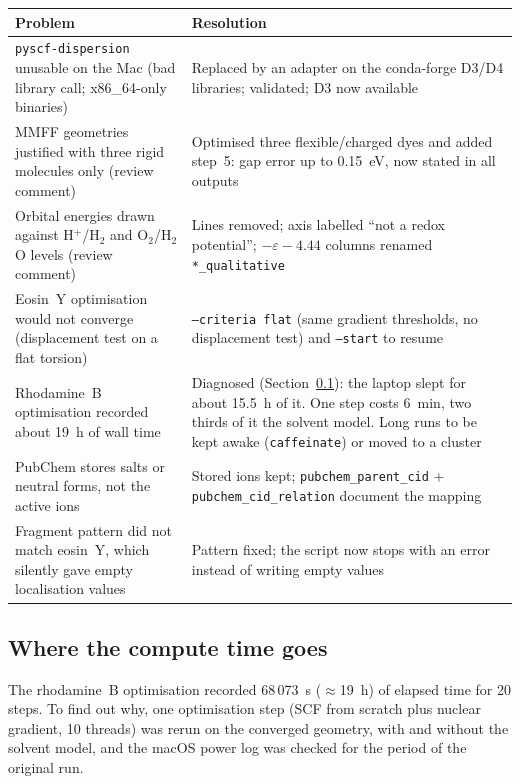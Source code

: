 \documentclass[11pt,a4paper]{article}
\begin{document}
\begin{center}\small
\begin{tabularx}{\linewidth}{@{}>{\raggedright\arraybackslash}p{4.1cm}>{\raggedright\arraybackslash}X@{}}
\toprule
Problem & Resolution \\
\midrule
\texttt{pyscf-dispersion} unusable on the Mac (bad library call; x86\_64-only binaries) &
  Replaced by an adapter on the conda-forge D3/D4 libraries; validated; D3 now available \\
MMFF geometries justified with three rigid molecules only (review comment) &
  Optimised three flexible/charged dyes and added step~5: gap error up to 0.15~eV, now stated in all outputs \\
Orbital energies drawn against H$^+$/H$_2$ and O$_2$/H$_2$O levels (review comment) &
  Lines removed; axis labelled ``not a redox potential''; $-\varepsilon-4.44$ columns renamed \texttt{*\_qualitative} \\
Eosin~Y optimisation would not converge (displacement test on a flat torsion) &
  \texttt{--criteria flat} (same gradient thresholds, no displacement test) and \texttt{--start} to resume \\
Rhodamine~B optimisation recorded about 19~h of wall time &
  Diagnosed (Section~\ref{sec:timing}): the laptop slept for about 15.5~h of it. One step costs 6~min, two thirds of it the solvent model. Long runs to be kept awake (\texttt{caffeinate}) or moved to a cluster \\
PubChem stores salts or neutral forms, not the active ions &
  Stored ions kept; \texttt{pubchem\_parent\_cid} + \texttt{pubchem\_cid\_relation} document the mapping \\
Fragment pattern did not match eosin~Y, which silently gave empty localisation values &
  Pattern fixed; the script now stops with an error instead of writing empty values \\
\bottomrule
\end{tabularx}
\end{center}

\subsection{Where the compute time goes}\label{sec:timing}
The rhodamine~B optimisation recorded 68\,073~s ($\approx$19~h) of elapsed time for 20 steps. To find
out why, one optimisation step (SCF from scratch plus nuclear gradient, 10 threads) was rerun on the
converged geometry, with and without the solvent model, and the macOS power log was checked for the
period of the original run.
\end{document}
